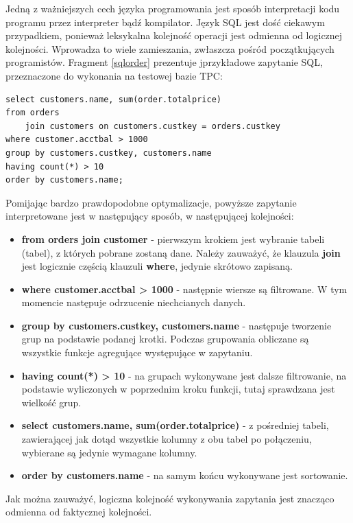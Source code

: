\documentclass[12pt]{extarticle}
\begin{document}
    Jedną z ważniejszych cech języka programowania jest sposób interpretacji kodu programu przez interpreter bądź kompilator. Język SQL jest dość ciekawym przypadkiem, ponieważ leksykalna kolejność operacji jest odmienna od logicznej kolejności. Wprowadza to wiele zamieszania, zwłaszcza pośród początkujących programistów. Fragment \ref{sqlorder} prezentuje jprzykładowe zapytanie SQL, przeznaczone do wykonania na testowej bazie TPC:


\begin{lstlisting}[label=sqlorder, caption=Przykład kolejności wykonywania zapytania SQL]
select customers.name, sum(order.totalprice)
from orders 
    join customers on customers.custkey = orders.custkey
where customer.acctbal > 1000
group by customers.custkey, customers.name
having count(*) > 10
order by customers.name;
\end{lstlisting}

Pomijając bardzo prawdopodobne optymalizacje, powyższe zapytanie interpretowane jest w następujący sposób, w następującej kolejności:

\begin{itemize}
    \item \textbf{from orders join customer} - pierwszym krokiem jest wybranie tabeli (tabel), z których pobrane zostaną dane. Należy zauważyć, że klauzula \textbf{join} jest logicznie częścią klauzuli \textbf{where}, jedynie skrótowo zapisaną.
    \item \textbf{where customer.acctbal > 1000} - następnie wiersze są filtrowane. W tym momencie następuje odrzucenie niechcianych danych. 
    \item \textbf{group by customers.custkey, customers.name} - następuje tworzenie grup na podstawie podanej krotki. Podczas grupowania obliczane są wszystkie funkcje agregujące występujące w zapytaniu.
    \item \textbf{having count(*) > 10} - na grupach wykonywane jest dalsze filtrowanie, na podstawie wyliczonych w poprzednim kroku funkcji, tutaj sprawdzana jest wielkość grup.
    \item \textbf{select customers.name, sum(order.totalprice)} - z pośredniej tabeli, zawierającej jak dotąd wszystkie kolumny z obu tabel po połączeniu, wybierane są jedynie wymagane kolumny.
    \item \textbf{order by customers.name} - na samym końcu wykonywane jest sortowanie.
\end{itemize}

Jak można zauważyć, logiczna kolejność wykonywania zapytania jest znacząco odmienna od faktycznej kolejności.
\end{document}
